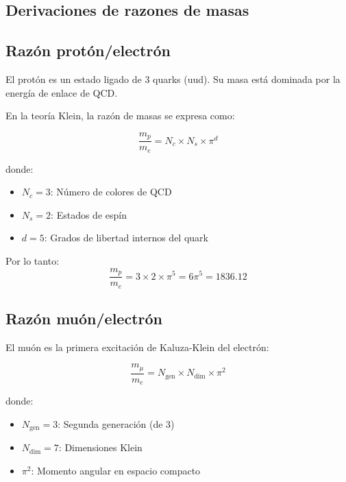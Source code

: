 \documentclass[12pt,a4paper,openany]{book}
\begin{document}
\begin{nivelmatematico}

\section*{Derivaciones de razones de masas}

\subsection*{Razón protón/electrón}

El protón es un estado ligado de 3 quarks (uud). Su masa está dominada por la energía de enlace de QCD.

En la teoría Klein, la razón de masas se expresa como:

\begin{equation}
    \frac{m_p}{m_e} = N_c \times N_s \times \pi^{d}
\end{equation}

donde:
\begin{itemize}
    \item $N_c = 3$: Número de colores de QCD
    \item $N_s = 2$: Estados de espín
    \item $d = 5$: Grados de libertad internos del quark
\end{itemize}

Por lo tanto:
\begin{equation}
    \frac{m_p}{m_e} = 3 \times 2 \times \pi^5 = 6\pi^5 = 1836.12
\end{equation}

\subsection*{Razón muón/electrón}

El muón es la primera excitación de Kaluza-Klein del electrón:

\begin{equation}
    \frac{m_\mu}{m_e} = N_{\text{gen}} \times N_{\text{dim}} \times \pi^2
\end{equation}

donde:
\begin{itemize}
    \item $N_{\text{gen}} = 3$: Segunda generación (de 3)
    \item $N_{\text{dim}} = 7$: Dimensiones Klein
    \item $\pi^2$: Momento angular en espacio compacto
\end{itemize}


\end{nivelmatematico}
\end{document}
